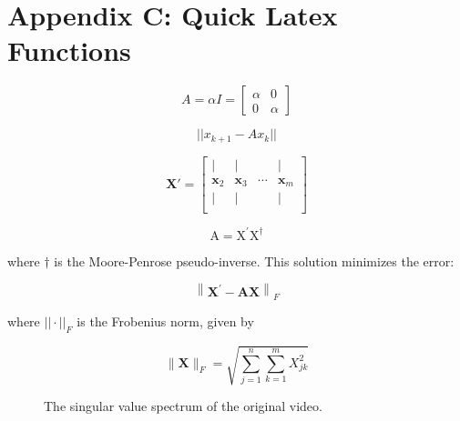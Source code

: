 \documentclass[conference]{IEEEtran}
\begin{document}
\section{Appendix C: Quick Latex Functions}

\begin{equation}
    A = \alpha I =
    \begin{bmatrix}
        \alpha & 0 \\
        0 & \alpha
    \end{bmatrix}
\end{equation}

\begin{equation}
    ||x_{k+1} - Ax_k||
\end{equation}

\begin{equation}
    \mathbf{X'}=\left[ \begin{array}{cccc}
    {| } & {| } & { } & {|} \\ 
    {\mathbf{x}_{2}} & {\mathbf{x}_{3}} & {\cdots} & {\mathbf{x}_{m}} \\
    {| } & {| } & { } & {|} \\ 
    \end{array}\right]
\end{equation}

\begin{equation}
    \mathrm{A}=\mathrm{X}^{\prime} \mathrm{X}^{\dagger}
\end{equation}

\noindent
where $\dagger$ is the Moore-Penrose pseudo-inverse. This solution minimizes the error:

\begin{equation}
    \left\|\mathbf{X}^{\prime}-\mathbf{A X}\right\|_{F}
\end{equation}

\noindent
where $||\cdot||_F$ is the Frobenius norm, given by

\begin{equation}
    \|\mathbf{X}\|_{F}=\sqrt{\sum_{j=1}^{n} \sum_{k=1}^{m} X_{j k}^{2}}
\end{equation}

\begin{figure}[ht!]
\caption{The singular value spectrum of the original video. }
\label{sing_val}
\end{figure}
\end{document}
